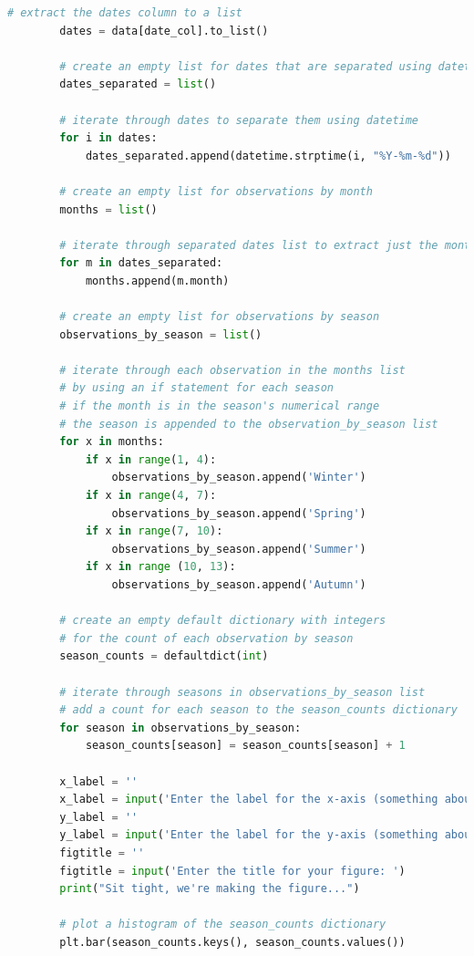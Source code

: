 \documentclass[letterpaper]{article}
\begin{document}
\begin{lstlisting}[language=Python]
        # extract the dates column to a list
        dates = data[date_col].to_list()

        # create an empty list for dates that are separated using datetime
        dates_separated = list()

        # iterate through dates to separate them using datetime
        for i in dates:
            dates_separated.append(datetime.strptime(i, "%Y-%m-%d"))

        # create an empty list for observations by month
        months = list()

        # iterate through separated dates list to extract just the month as an integer
        for m in dates_separated:
            months.append(m.month)

        # create an empty list for observations by season
        observations_by_season = list()

        # iterate through each observation in the months list
        # by using an if statement for each season
        # if the month is in the season's numerical range
        # the season is appended to the observation_by_season list
        for x in months:
            if x in range(1, 4):
                observations_by_season.append('Winter')
            if x in range(4, 7):
                observations_by_season.append('Spring')
            if x in range(7, 10):
                observations_by_season.append('Summer')
            if x in range (10, 13):
                observations_by_season.append('Autumn')

        # create an empty default dictionary with integers
        # for the count of each observation by season
        season_counts = defaultdict(int)

        # iterate through seasons in observations_by_season list
        # add a count for each season to the season_counts dictionary
        for season in observations_by_season:
            season_counts[season] = season_counts[season] + 1

        x_label = ''
        x_label = input('Enter the label for the x-axis (something about seasons): ')
        y_label = ''
        y_label = input('Enter the label for the y-axis (something about number of occurrences): ')
        figtitle = ''
        figtitle = input('Enter the title for your figure: ')
        print("Sit tight, we're making the figure...")

        # plot a histogram of the season_counts dictionary
        plt.bar(season_counts.keys(), season_counts.values())


\end{lstlisting}
\end{document}
